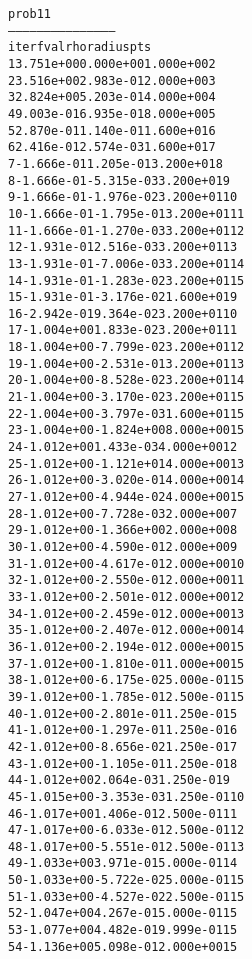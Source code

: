 \begin{alltt}
prob11
---------------------------------------------
iter        fval         rho      radius  pts
   1   3.751e+00   0.000e+00   1.000e+00    2
   2   3.516e+00   2.983e-01   2.000e+00    3
   3   2.824e+00   5.203e-01   4.000e+00    4
   4   9.003e-01   6.935e-01   8.000e+00    5
   5   2.870e-01   1.140e-01   1.600e+01    6
   6   2.416e-01   2.574e-03   1.600e+01    7
   7  -1.666e-01   1.205e-01   3.200e+01    8
   8  -1.666e-01  -5.315e-03   3.200e+01    9
   9  -1.666e-01  -1.976e-02   3.200e+01   10
  10  -1.666e-01  -1.795e-01   3.200e+01   11
  11  -1.666e-01  -1.270e-03   3.200e+01   12
  12  -1.931e-01   2.516e-03   3.200e+01   13
  13  -1.931e-01  -7.006e-03   3.200e+01   14
  14  -1.931e-01  -1.283e-02   3.200e+01   15
  15  -1.931e-01  -3.176e-02   1.600e+01    9
  16  -2.942e-01   9.364e-02   3.200e+01   10
  17  -1.004e+00   1.833e-02   3.200e+01   11
  18  -1.004e+00  -7.799e-02   3.200e+01   12
  19  -1.004e+00  -2.531e-01   3.200e+01   13
  20  -1.004e+00  -8.528e-02   3.200e+01   14
  21  -1.004e+00  -3.170e-02   3.200e+01   15
  22  -1.004e+00  -3.797e-03   1.600e+01   15
  23  -1.004e+00  -1.824e+00   8.000e+00   15
  24  -1.012e+00   1.433e-03   4.000e+00   12
  25  -1.012e+00  -1.121e+01   4.000e+00   13
  26  -1.012e+00  -3.020e-01   4.000e+00   14
  27  -1.012e+00  -4.944e-02   4.000e+00   15
  28  -1.012e+00  -7.728e-03   2.000e+00    7
  29  -1.012e+00  -1.366e+00   2.000e+00    8
  30  -1.012e+00  -4.590e-01   2.000e+00    9
  31  -1.012e+00  -4.617e-01   2.000e+00   10
  32  -1.012e+00  -2.550e-01   2.000e+00   11
  33  -1.012e+00  -2.501e-01   2.000e+00   12
  34  -1.012e+00  -2.459e-01   2.000e+00   13
  35  -1.012e+00  -2.407e-01   2.000e+00   14
  36  -1.012e+00  -2.194e-01   2.000e+00   15
  37  -1.012e+00  -1.810e-01   1.000e+00   15
  38  -1.012e+00  -6.175e-02   5.000e-01   15
  39  -1.012e+00  -1.785e-01   2.500e-01   15
  40  -1.012e+00  -2.801e-01   1.250e-01    5
  41  -1.012e+00  -1.297e-01   1.250e-01    6
  42  -1.012e+00  -8.656e-02   1.250e-01    7
  43  -1.012e+00  -1.105e-01   1.250e-01    8
  44  -1.012e+00   2.064e-03   1.250e-01    9
  45  -1.015e+00  -3.353e-03   1.250e-01   10
  46  -1.017e+00   1.406e-01   2.500e-01   11
  47  -1.017e+00  -6.033e-01   2.500e-01   12
  48  -1.017e+00  -5.551e-01   2.500e-01   13
  49  -1.033e+00   3.971e-01   5.000e-01   14
  50  -1.033e+00  -5.722e-02   5.000e-01   15
  51  -1.033e+00  -4.527e-02   2.500e-01   15
  52  -1.047e+00   4.267e-01   5.000e-01   15
  53  -1.077e+00   4.482e-01   9.999e-01   15
  54  -1.136e+00   5.098e-01   2.000e+00   15

\end{alltt}
